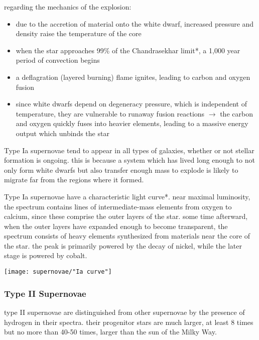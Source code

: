 regarding the mechanics of the explosion:
\begin{itemize}[noitemsep]
	\item due to the accretion of material onto the white dwarf, increased pressure and density raise the temperature of the core
	\item when the star approaches 99\% of the \gls{Chandrasekhar limit}*, a 1,000 year period of convection begins
	\item a deflagration (layered burning) flame ignites, leading to carbon and oxygen fusion
	\item since white dwarfs depend on degeneracy pressure, which is independent of temperature, they are vulnerable to runaway fusion reactions $\rightarrow$ the carbon and oxygen quickly fuses into heavier elements, leading to a massive energy output which unbinds the star
\end{itemize}
Type Ia supernovae tend to appear in all types of galaxies, whether or not stellar formation is ongoing. this is because a system which has lived long enough to not only form white dwarfs but also transfer enough mass to explode is likely to migrate far from the regions where it formed.

Type Ia supernovae have a characteristic \gls{light curve}*. near maximal luminosity, the spectrum contains lines of intermediate-mass elements from oxygen to calcium, since these comprise the outer layers of the star. some time afterward, when the outer layers have expanded enough to become transparent, the spectrum consists of heavy elements synthesized from materials near the core of the star. the peak is primarily powered by the decay of nickel, while the later stage is powered by cobalt.
\begin{center}
\texttt{[image: supernovae/"Ia curve"]}
\end{center}

\subsubsection{Type II Supernovae}
type II supernovae are distinguished from other supernovae by the presence of hydrogen in their spectra. their progenitor stars are much larger, at least 8 times but no more than 40-50 times, larger than the sun of the Milky Way.

